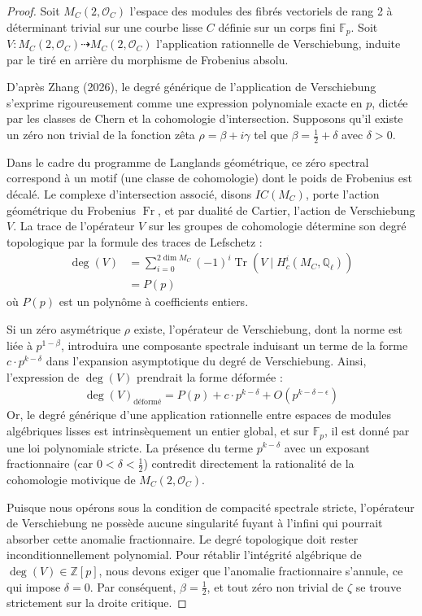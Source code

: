 \documentclass[
]{article}
\begin{document}
\begin{proof}
Soit $M_C(2, \mathcal{O}_C)$ l'espace des modules des fibrés vectoriels de rang 2 à déterminant trivial sur une courbe lisse $C$ définie sur un corps fini $\mathbb{F}_p$. Soit $V : M_C(2, \mathcal{O}_C) \dashrightarrow M_C(2, \mathcal{O}_C)$ l'application rationnelle de Verschiebung, induite par le tiré en arrière du morphisme de Frobenius absolu.

D'après Zhang (2026), le degré générique de l'application de Verschiebung s'exprime rigoureusement comme une expression polynomiale exacte en $p$, dictée par les classes de Chern et la cohomologie d'intersection. Supposons qu'il existe un zéro non trivial de la fonction zêta $\rho = \beta + i\gamma$ tel que $\beta = \frac{1}{2} + \delta$ avec $\delta > 0$.

Dans le cadre du programme de Langlands géométrique, ce zéro spectral correspond à un motif (une classe de cohomologie) dont le poids de Frobenius est décalé. Le complexe d'intersection associé, disons $IC(M_C)$, porte l'action géométrique du Frobenius $\operatorname{Fr}$, et par dualité de Cartier, l'action de Verschiebung $V$.
La trace de l'opérateur $V$ sur les groupes de cohomologie détermine son degré topologique par la formule des traces de Lefschetz :
\begin{align*}
\deg(V) &= \sum_{i=0}^{2\dim M_C} (-1)^i \operatorname{Tr}(V \mid H^i_c(M_C, \mathbb{Q}_\ell)) \\
&= P(p)
\end{align*}
où $P(p)$ est un polynôme à coefficients entiers.

Si un zéro asymétrique $\rho$ existe, l'opérateur de Verschiebung, dont la norme est liée à $p^{1-\beta}$, introduira une composante spectrale induisant un terme de la forme $c \cdot p^{k - \delta}$ dans l'expansion asymptotique du degré de Verschiebung.
Ainsi, l'expression de $\deg(V)$ prendrait la forme déformée :
\begin{align*}
\deg(V)_{\text{déformé}} = P(p) + c \cdot p^{k - \delta} + O(p^{k - \delta - \epsilon})
\end{align*}
Or, le degré générique d'une application rationnelle entre espaces de modules algébriques lisses est intrinsèquement un entier global, et sur $\mathbb{F}_p$, il est donné par une loi polynomiale stricte. La présence du terme $p^{k - \delta}$ avec un exposant fractionnaire (car $0 < \delta < \frac{1}{2}$) contredit directement la rationalité de la cohomologie motivique de $M_C(2, \mathcal{O}_C)$.

Puisque nous opérons sous la condition de compacité spectrale stricte, l'opérateur de Verschiebung ne possède aucune singularité fuyant à l'infini qui pourrait absorber cette anomalie fractionnaire. Le degré topologique doit rester inconditionnellement polynomial.
Pour rétablir l'intégrité algébrique de $\deg(V) \in \mathbb{Z}[p]$, nous devons exiger que l'anomalie fractionnaire s'annule, ce qui impose $\delta = 0$. Par conséquent, $\beta = \frac{1}{2}$, et tout zéro non trivial de $\zeta$ se trouve strictement sur la droite critique.
\end{proof}
\end{document}
